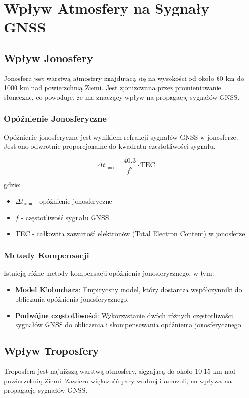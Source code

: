 \section{Wpływ Atmosfery na Sygnały GNSS}

\subsection{Wpływ Jonosfery}
Jonosfera jest warstwą atmosfery znajdującą się na wysokości od około 60 km do 1000 km nad powierzchnią Ziemi. Jest zjonizowana przez promieniowanie słoneczne, co powoduje, że ma znaczący wpływ na propagację sygnałów GNSS.

\subsubsection{Opóźnienie Jonosferyczne}
Opóźnienie jonosferyczne jest wynikiem refrakcji sygnałów GNSS w jonosferze. Jest ono odwrotnie proporcjonalne do kwadratu częstotliwości sygnału.

\[
\Delta t_{\text{iono}} = \frac{40.3}{f^2} \cdot \text{TEC}
\]

gdzie:
\begin{itemize}
    \item \( \Delta t_{\text{iono}} \) - opóźnienie jonosferyczne
    \item \( f \) - częstotliwość sygnału GNSS
    \item TEC - całkowita zawartość elektronów (Total Electron Content) w jonosferze
\end{itemize}

\subsubsection{Metody Kompensacji}
Istnieją różne metody kompensacji opóźnienia jonosferycznego, w tym:
\begin{itemize}
    \item \textbf{Model Klobuchara}: Empiryczny model, który dostarcza współczynniki do obliczania opóźnienia jonosferycznego.
    \item \textbf{Podwójne częstotliwości}: Wykorzystanie dwóch różnych częstotliwości sygnałów GNSS do obliczenia i skompensowania opóźnienia jonosferycznego.
\end{itemize}

\subsection{Wpływ Troposfery}
Troposfera jest najniższą warstwą atmosfery, sięgającą do około 10-15 km nad powierzchnią Ziemi. Zawiera większość pary wodnej i aerozoli, co wpływa na propagację sygnałów GNSS.

